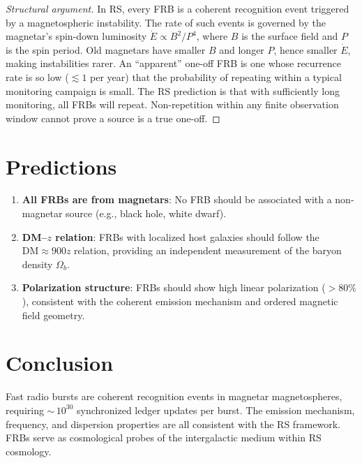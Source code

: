 \documentclass[12pt,a4paper]{article}
\theoremstyle{definition}
\theoremstyle{remark}
\begin{document}
\begin{proof}[Structural argument]
In RS, every FRB is a coherent recognition event triggered by a
magnetospheric instability.  The rate of such events is governed by
the magnetar's spin-down luminosity $\dot{E} \propto B^2/P^4$, where
$B$ is the surface field and $P$ is the spin period.  Old magnetars
have smaller $B$ and longer $P$, hence smaller $\dot{E}$, making
instabilities rarer.  An ``apparent'' one-off FRB is one whose
recurrence rate is so low ($\lesssim 1$ per year) that the probability
of repeating within a typical monitoring campaign is small.  The RS
prediction is that with sufficiently long monitoring, all FRBs will
repeat.  Non-repetition within any finite observation window cannot
prove a source is a true one-off.
\end{proof}

\section{Predictions}
\label{sec:predictions}

\begin{enumerate}
  \item \textbf{All FRBs are from magnetars}: No FRB should be
  associated with a non-magnetar source (e.g., black hole, white
  dwarf).

  \item \textbf{DM--$z$ relation}: FRBs with localized host galaxies
  should follow the $\mathrm{DM} \approx 900z$ relation, providing
  an independent measurement of the baryon density $\Omega_b$.

  \item \textbf{Polarization structure}: FRBs should show high
  linear polarization ($> 80\%$), consistent with the coherent
  emission mechanism and ordered magnetic field geometry.
\end{enumerate}

\section{Conclusion}
\label{sec:conclusion}

Fast radio bursts are coherent recognition events in magnetar
magnetospheres, requiring ${\sim}\,10^{30}$ synchronized ledger
updates per burst.  The emission mechanism, frequency, and
dispersion properties are all consistent with the RS framework.
FRBs serve as cosmological probes of the intergalactic medium
within RS cosmology.
\end{document}
